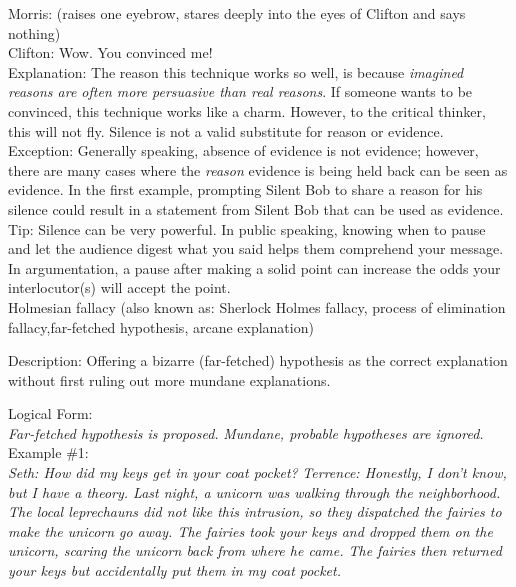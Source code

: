 \documentclass[a4paper,12pt,single,pdftex]{scrbook}
\begin{document}
    
      Morris: (raises one eyebrow, stares deeply into the eyes of Clifton and says nothing)
    \\

    
      Clifton: Wow. You convinced me!
    \\

    
      Explanation: The reason this technique works so well, is because {\it imagined reasons are often more persuasive than real reasons}.  If someone wants to be convinced, this technique works like a charm.  However, to the critical thinker, this will not fly.  Silence is not a valid substitute for reason or evidence.
    \\

    
      Exception: Generally speaking, absence of evidence is not evidence; however, there are many cases where the {\it reason} evidence is being held back can be seen as evidence.  In the first example, prompting Silent Bob to share a reason for his silence could result in a statement from Silent Bob that can be used as evidence.
    \\

    
      Tip: Silence can be very powerful. In public speaking, knowing when to pause and let the audience digest what you said helps them comprehend your message. In argumentation, a pause after making a solid point can increase the odds your interlocutor(s) will accept the point.
    \\

  

Holmesian fallacy
    (also known as: Sherlock Holmes fallacy, process of elimination fallacy,far-fetched hypothesis, arcane explanation)
  
    Description: Offering a bizarre (far-fetched) hypothesis as the correct explanation without first ruling out more mundane explanations.

    
      Logical Form:
    \\

    
      {\em Far-fetched hypothesis is proposed.} \newline
{\em Mundane, probable hypotheses are ignored.}
    \\

    
      Example \#1:
    \\

    
      {\em Seth: How did my keys get in your coat pocket?} \newline
{\em Terrence: Honestly, I don’t know,  but I have a theory.  Last night, a unicorn was walking through the neighborhood.  The local leprechauns did not like this intrusion, so they dispatched the fairies to make the unicorn go away.  The fairies took your keys and dropped them on the unicorn, scaring the unicorn back from where he came.  The fairies then returned your keys but accidentally put them in my coat pocket.}
    \\
\end{document}
